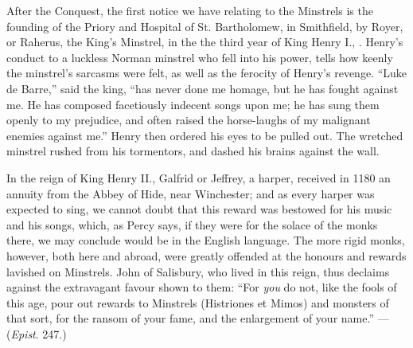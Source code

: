 
After the Conquest, the first notice we have relating to the Minstrels is the 
founding of the Priory and Hospital of St. Bartholo\-mew, in Smithfield, by
Royer, or Raherus, the King’s Minstrel, in the the third year of King Henry I.,
. Henry’s conduct to a luckless Norman minstrel who fell into his power,
tells how keenly the minstrel’s sarcasms were felt, as well as the ferocity of Henry’s
revenge. “Luke de Barre,” said the king, “has never done me homage, but he has
fought against me. He has composed facetiously indecent songs upon me; he has
sung them openly to my prejudice, and often raised the horse-laughs of my malignant
enemies against me.” Henry then ordered his eyes to be pulled out. The
wretched minstrel rushed from his tormentors, and dashed his brains against
the wall.

In the reign of King Henry II., Galfrid or Jeffrey, a harper, received in 1180
an annuity from the Abbey of Hide, near Winchester; and as every harper was
expected to sing, we cannot doubt that this reward was bestowed for his music
and his songs, which, as Percy says, if they were for the solace of the monks there,
we may conclude would be in the English language. The more rigid monks,
however, both here and abroad, were greatly offended at the honours and rewards
lavished on Minstrels. John of Salisbury, who lived in this reign, thus declaims
against the extravagant favour shown to them: “For \textit{you} do not, like the fools of
this age, pour out rewards to Minstrels (Histriones et Mimos) and monsters of
that sort, for the ransom of your fame, and the enlargement of your name.”
—(\textit{Epist}. 247.)

